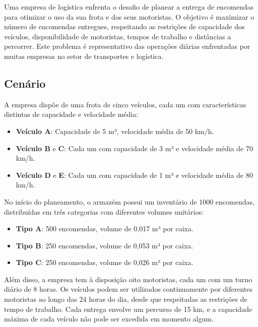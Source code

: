 Uma empresa de logística enfrenta o desafio de planear a entrega de encomendas para otimizar o uso da sua frota e dos seus motoristas.
O objetivo é maximizar o número de encomendas entregues, respeitando as restrições de capacidade dos veículos, disponibilidade de motoristas, tempos de trabalho e distâncias a percorrer.
Este problema é representativo das operações diárias enfrentadas por muitas empresas no setor de transportes e logística.

\subsection{Cenário}\label{subsec:cenario}
A empresa dispõe de uma frota de cinco veículos, cada um com características distintas de capacidade e velocidade média:
\begin{itemize}
    \item \textbf{Veículo A}: Capacidade de 5 m³, velocidade média de 50 km/h.
    \item \textbf{Veículo B} e \textbf{C}: Cada um com capacidade de 3 m³ e velocidade média de 70 km/h.
    \item \textbf{Veículo D} e \textbf{E}: Cada um com capacidade de 1 m³ e velocidade média de 80 km/h.
\end{itemize}
No início do planeamento, o armazém possui um inventário de 1000 encomendas, distribuídas em três categorias com diferentes volumes unitários:
\begin{itemize}
    \item \textbf{Tipo A}: 500 encomendas, volume de 0,017 m³ por caixa.
    \item \textbf{Tipo B}: 250 encomendas, volume de 0,053 m³ por caixa.
    \item \textbf{Tipo C}: 250 encomendas, volume de 0,026 m³ por caixa.
\end{itemize}
Além disso, a empresa tem à disposição oito motoristas, cada um com um turno diário de 8 horas.
Os veículos podem ser utilizados continuamente por diferentes motoristas ao longo das 24 horas do dia, desde que respeitadas as restrições de tempo de trabalho.
Cada entrega envolve um percurso de 15 km, e a capacidade máxima de cada veículo não pode ser excedida em momento algum.

